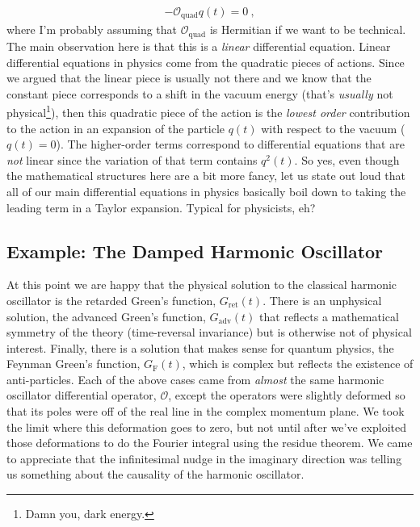 \begin{align}
	-\mathcal O_\text{quad} q(t) = 0 \ ,
\end{align}
where I'm probably assuming that $\mathcal O_\text{quad}$ is Hermitian if we want to be technical. The main observation here is that this is a \emph{linear} differential equation. Linear differential equations in physics come from the quadratic pieces of actions. Since we argued that the linear piece is usually not there and we know that the constant piece corresponds to a shift in the vacuum energy (that's \emph{usually} not physical\footnote{Damn you, dark energy.}), then this quadratic piece of the action is the \emph{lowest order} contribution to the action in an expansion of the particle $q(t)$ with respect to the vacuum ($q(t)=0$). The higher-order terms correspond to differential equations that are \emph{not} linear since the variation of that term contains $q^2(t)$. So yes, even though the mathematical structures here are a bit more fancy, let us state out loud that all of our main differential equations in physics basically boil down to taking the leading term in a Taylor expansion. Typical for physicists, eh?



\subsection{Example: The Damped Harmonic Oscillator}
 
 At this point we are happy that the physical solution to the classical harmonic oscillator is the retarded Green's function, $G_\text{ret}(t)$. There is an unphysical solution, the advanced Green's function, $G_\text{adv}(t)$ that reflects a mathematical symmetry of the theory (time-reversal invariance) but is otherwise not of physical interest. Finally, there is a solution that makes sense for quantum physics, the Feynman Green's function, $G_\text{F}(t)$, which is complex but reflects the existence of anti-particles. Each of the above cases came from \emph{almost} the same harmonic oscillator differential operator, $\mathcal O$, except the operators were slightly deformed so that its poles were off of the real line in the complex momentum plane. We took the limit where this deformation goes to zero, but not until after we've exploited those deformations to do the Fourier integral using the residue theorem. We came to appreciate that the infinitesimal nudge in the imaginary direction was telling us something about the causality of the harmonic oscillator.

